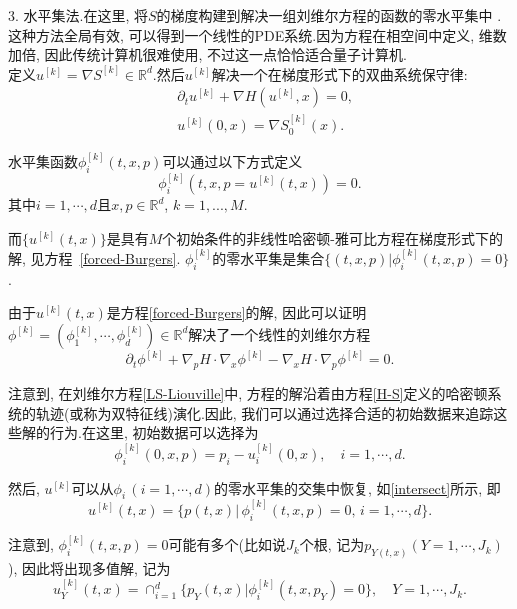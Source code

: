 3.  水平集法\cite{47}.在这里, 将$S$的梯度构建到解决一组刘维尔方程的函数的零水平集中 .这种方法全局有效, 可以得到一个线性的PDE系统.因为方程在相空间中定义, 维数加倍, 因此传统计算机很难使用, 不过这一点恰恰适合量子计算机. \\

定义$u^{[k]}=\nabla S^{[k]} \in \mathbb{R}^d$.然后$u^{[k]}$解决一个在梯度形式下的双曲系统保守律:
\begin{align}
	& \partial_t u^{[k]} + \nabla H(u^{[k]}, x) = 0, \label{forced-Burgers} \\
	&u^{[k]}(0,x)=\nabla S^{[k]}_0(x).
\end{align}


水平集函数$\phi^{[k]}_i(t,x,p)$可以通过以下方式定义
\begin{equation}
	\phi^{[k]}_i(t, x,p=u^{[k]}(t,x))=0.
\end{equation}
其中$i=1, \cdots, d$且$x, p\in \mathbb{R}^d$, $k=1,...,M$.

而$\{u^{[k]}(t,x)\}$是具有$M$个初始条件的非线性哈密顿-雅可比方程在梯度形式下的解, 见方程~\cref{forced-Burgers}. $\phi^{[k]}_i$的零水平集是集合$\{(t,x,p)|\phi^{[k]}_i(t,x,p)=0\}$.

由于$u^{[k]}(t,x)$是方程\cref{forced-Burgers}的解, 因此可以证明$\phi^{[k]}=(\phi^{[k]}_1, \cdots, \phi^{[k]}_d)\in \mathbb{R}^d$解决了一个线性的刘维尔方程
\begin{equation}
	\partial_t \phi^{[k]} + \nabla_p H \cdot \nabla_x \phi^{[k]} - \nabla_x H \cdot \nabla_p \phi^{[k]}=0.\label{LS-Liouville}
\end{equation}

注意到, 在刘维尔方程\cref{LS-Liouville}中, 方程的解沿着由方程\cref{H-S}定义的哈密顿系统的轨迹(或称为双特征线)演化.因此, 我们可以通过选择合适的初始数据来追踪这些解的行为.在这里, 初始数据可以选择为
\begin{equation}
	\phi^{[k]}_i(0, x,p)=p_i - u^{[k]}_i(0,x), \quad i=1, \cdots, d.
\end{equation}

然后, $u^{[k]}$可以从$\phi_i \, (i=1, \cdots, d)$的零水平集的交集中恢复, 如\cref{intersect}所示, 即
\begin{equation}
	u^{[k]}(t,x)=\{p(t,x)| \,\phi_i^{[k]}(t,x,p)=0, \, i=1,\cdots, d \}. 
\end{equation}

注意到, $\phi_i^{[k]}(t,x,p)=0$可能有多个(比如说$J_k$个根, 记为$p_{Y(t,x)} (Y=1, \cdots, J_k)$), 因此将出现多值解, 记为
\begin{equation}
	u^{[k]}_{Y}(t,x)= \cap_{i=1}^d \{p_{Y}(t,x) | \phi^{[k]}_i(t,x,p_{Y})=0\}, \quad Y=1, \cdots, J_k.\label{intersect}
\end{equation}

